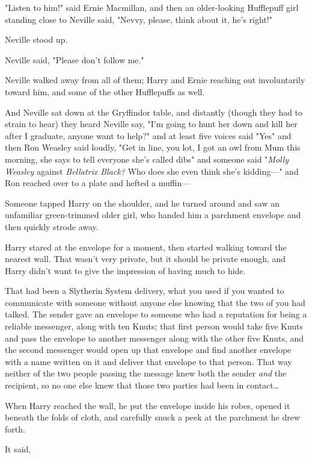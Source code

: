 "Listen to him!" said Ernie Macmillan, and then an older-looking Hufflepuff 
girl standing close to Neville said, "Nevvy, please, think about it, he's 
right!"

Neville stood up.

Neville said, "Please don't follow me."

Neville walked away from all of them; Harry and Ernie reaching out 
involuntarily toward him, and some of the other Hufflepuffs as well.

And Neville sat down at the Gryffindor table, and distantly (though they had to 
strain to hear) they heard Neville say, "I'm going to hunt her down and kill 
her after I graduate, anyone want to help?" and at least five voices said "Yes" 
and then Ron Weasley said loudly, "Get in line, you lot, I got an owl from Mum 
this morning, she says to tell everyone she's called dibs" and someone said 
"\emph{Molly Weasley} against \emph{Bellatrix Black?} Who does she even think 
she's kidding---" and Ron reached over to a plate and hefted a muffin---

Someone tapped Harry on the shoulder, and he turned around and saw an 
unfamiliar green-trimmed older girl, who handed him a parchment envelope and 
then quickly strode away.

Harry stared at the envelope for a moment, then started walking toward the 
nearest wall. That wasn't very private, but it should be private enough, and 
Harry didn't want to give the impression of having much to hide.

That had been a Slytherin System delivery, what you used if you wanted to 
communicate with someone without anyone else knowing that the two of you had 
talked. The sender gave an envelope to someone who had a reputation for being a 
reliable messenger, along with ten Knuts; that first person would take five 
Knuts and pass the envelope to another messenger along with the other five 
Knuts, and the second messenger would open up that envelope and find another 
envelope with a name written on it and deliver that envelope to that person. 
That way neither of the two people passing the message knew both the sender 
\emph{and} the recipient, so no one else knew that those two parties had been 
in contact{\ldots}

When Harry reached the wall, he put the envelope inside his robes, opened it 
beneath the folds of cloth, and carefully snuck a peek at the parchment he drew 
forth.

It said,

